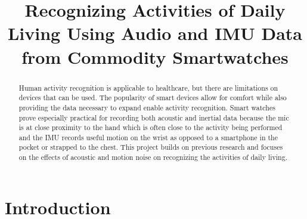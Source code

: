 \documentclass[conference]{IEEEtran}
\begin{document}
	
	\title{Recognizing Activities of Daily Living Using Audio and IMU Data from Commodity Smartwatches
	}
	
	\author{
		
		\and
		
		\and
	}
	
	\maketitle
	
	\begin{abstract}
		Human activity recognition is applicable to healthcare, but there are limitations on devices that can be used.
		The popularity of smart devices allow for comfort while also providing the data necessary to expand enable activity recognition.
		Smart watches prove especially practical for recording both acoustic and inertial data because the mic is at close proximity to the hand which is often close to the activity being performed and the IMU records useful motion on the wrist as opposed to a smartphone in the pocket or strapped to the chest.
		This project builds on previous research and focuses on the effects of acoustic and motion noise on recognizing the activities of daily living.
		
	\end{abstract}
	
	
	\section{Introduction}
	
\end{document}
